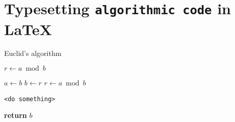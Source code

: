 \documentclass{article}[journal]
\begin{document}
\section*{Typesetting \texttt{algorithmic code} in \LaTeX} %

\begin{algorithm}  %
  \caption{Euclid’s algorithm}\label{euclid}  %
  \begin{algorithmic}[1]  %

       
      \State $r\gets a\bmod b$

        \State $a\gets b$
        \State $b\gets r$
        \State $r\gets a\bmod b$
      \EndWhile\label{euclidendwhile}  %

        \State \texttt{<do something>}
      \EndFor  %

      \State \textbf{return} $b$ 
    
    \EndProcedure  %

  \end{algorithmic}
\end{algorithm}
\end{document}
